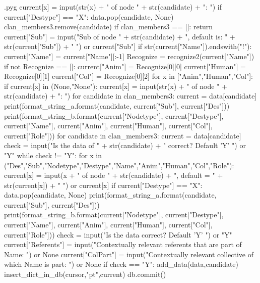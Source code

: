 \documentclass{report}
\makeatletter
\newenvironment{python}{%
  \VerbatimEnvironment
  \minted@resetoptions
  \setkeys{minted@opt}{}
      \begin{VerbatimOut}{\jobname.pyg}}
{%
      \end{VerbatimOut}
      \minted@pygmentize{python}
      \DeleteFile{\jobname.pyg}}
\makeatother
\begin{document}
\begin{python}
                current[x] = input(str(x) + " of node " + str(candidate) + ": ")
                if current["Destype"] == "X":
                    data.pop(candidate, None)
                    clan_members3.remove(candidate)
                    if clan_members3 == []:
                        return
        current["Sub"] = input("Sub of node " + str(candidate) + ", default is: " + str(current["Sub"]) + " ") or current["Sub"]
        if str(current["Name"]).endswith("!"):
            current["Name"] = current["Name"][:-1]
            Recognize = recognize2(current["Name"]) 
            if not Recognize == []:
                current["Anim"] = Recognize[0][0]
                current["Human"] = Recognize[0][1]
                current["Col"] = Recognize[0][2]
        for x in ["Anim","Human","Col"]:
            if current[x] in (None,"None"):
                current[x] = input(str(x) + " of node " + str(candidate) + ": ")
    for candidate in clan_members3:
        current = data[candidate]
        print(format_string_a.format(candidate, current["Sub"], current["Des"]))
        print(format_string_b.format(current["Nodetype"], current["Destype"], current["Name"], current["Anim"], current["Human"], current["Col"], current["Role"]))
    for candidate in clan_members3:
        current = data[candidate]
        check = input("Is the data of " + str(candidate) + " correct? Default 'Y' ") or "Y"
        while check != "Y":
            for x in ("Des","Sub","Nodetype","Destype","Name","Anim","Human","Col","Role"):
                current[x] = input(x + " of node " + str(candidate) + ", default = " + str(current[x]) + " ") or current[x] 
                if current["Destype"] == "X":
                    data.pop(candidate, None)
            print(format_string_a.format(candidate, current["Sub"], current["Des"]))
            print(format_string_b.format(current["Nodetype"], current["Destype"], current["Name"], current["Anim"], current["Human"], current["Col"], current["Role"]))
            check = input("Is the data correct? Default 'Y' ") or "Y"
        current["Referents"] = input("Contextually relevant referents that are part of Name: ") or None
        current["ColPart"] = input("Contextually relevant collective of which Name is part: ") or None
        if check == "Y":
            add_data(data,candidate)
            insert_dict_in_db(cursor,"pt",current)
            db.commit()

\end{python}
\end{document}
